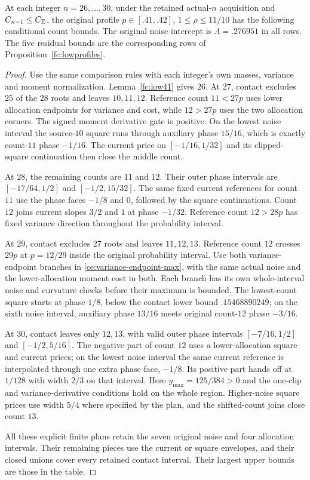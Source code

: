 \begin{corollary}\label{fc:p41-strip}\label{fc:n27-low41}\label{fc:n28-low41}\label{fc:n29-low41}\label{fc:n30-low41}
At each integer $n=26,\ldots,30$, under the retained actual-$n$ acquisition
and $C_{n-1}\le C_{\mathrm E}$, the original profile $p\in[.41,.42]$,
$1\le\rho\le11/10$ has the following conditional count bounds.
The original noise intercept is $\Lambda=.276951$ in all rows.
The five residual bounds are the corresponding rows of
Proposition~\ref{fc:lowprofiles}.

\end{corollary}
\begin{proof}
Use the same comparison rules with each integer's own masses,
variance and moment normalization. Lemma~\ref{fc:low41} gives $26$.
At $27$, contact excludes
$25$ of the $28$ roots and leaves $10,11,12$.
Reference count $11<27p$ uses lower allocation
endpoints for variance and cost, while $12>27p$ uses the two
allocation corners. The signed moment derivative gate is positive.
On the lowest noise interval the source-$10$ square
runs through auxiliary phase $15/16$, which is exactly count-$11$
phase $-1/16$. The current price on $[-1/16,1/32]$ and its
clipped-square continuation then close the middle count.

At $28$, the remaining counts are $11$ and $12$.
Their outer phase intervals are $[-17/64,1/2]$ and $[-1/2,15/32]$.
The same fixed current
references for count $11$ use the phase faces $-1/8$ and $0$,
followed by the square continuations. Count $12$ joins current
slopes $3/2$ and $1$ at phase $-1/32$. Reference count $12>28p$
has fixed variance direction throughout the probability interval.

At $29$, contact excludes $27$ roots and leaves $11,12,13$.
Reference count $12$ crosses $29p$ at $p=12/29$ inside the
original probability interval. Use both variance-endpoint branches
in \eqref{ce:variance-endpoint-max}, with the same actual noise
and the lower-allocation moment cost in both. Each branch has
its own whole-interval noise and curvature checks before their
maximum is bounded. The lowest-count square starts at phase
$1/8$, below the contact lower bound $.15468890249$; on the
sixth noise interval, auxiliary phase $13/16$ meets original
count-$12$ phase $-3/16$.

At $30$, contact leaves only $12,13$, with valid outer phase
intervals $[-7/16,1/2]$ and $[-1/2,5/16]$. The negative part
of count $12$ uses a lower-allocation square and current prices;
on the lowest noise interval the same current reference is
interpolated through one extra phase face, $-1/8$.
Its positive part hands off at $1/128$ with width $2/3$ on
that interval. Here $y_{\max}=125/384>0$ and the one-clip
and variance-derivative conditions hold on the whole region.
Higher-noise square prices use width $5/4$ where specified
by the plan, and the shifted-count joins close count $13$.

All these explicit finite plans retain the seven original noise and
four allocation intervals. Their remaining pieces use the current
or square envelopes, and their closed unions cover every retained
contact interval. Their largest upper bounds are those in the table.
\end{proof}
